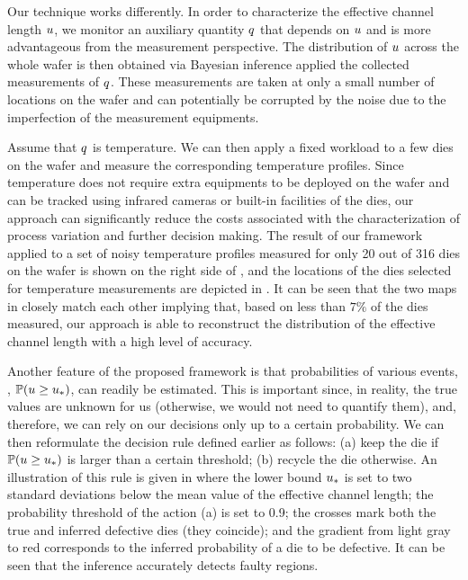 Our technique works differently.
In order to characterize the effective channel length $u$, we monitor an auxiliary quantity $q$ that depends on $u$ and is more advantageous from the measurement perspective.
The distribution of $u$ across the whole wafer is then obtained via Bayesian inference \cite{gelman2004} applied the collected measurements of $q$.
These measurements are taken at only a small number of locations on the wafer and can potentially be corrupted by the noise due to the imperfection of the measurement equipments.

Assume that $q$ is temperature.
We can then apply a fixed workload to a few dies on the wafer and measure the corresponding temperature profiles.
Since temperature does not require extra equipments to be deployed on the wafer and can be tracked using infrared cameras \cite{mesa-martinez2007} or built-in facilities of the dies, our approach can significantly reduce the costs associated with the characterization of process variation and further decision making.
The result of our framework applied to a set of noisy temperature profiles measured for only 20 out of 316 dies on the wafer is shown on the right side of , and the locations of the dies selected for temperature measurements are depicted in .
It can be seen that the two maps in  closely match each other implying that, based on less than $7\%$ of the dies measured, our approach is able to reconstruct the distribution of the effective channel length with a high level of accuracy.

Another feature of the proposed framework is that probabilities of various events, \eg, $\mathbb{P}(u \geq u_*)$, can readily be estimated.
This is important since, in reality, the true values are unknown for us (otherwise, we would not need to quantify them), and, therefore, we can rely on our decisions only up to a certain probability.
We can then reformulate the decision rule defined earlier as follows: (a) keep the die if $\mathbb{P}(u \geq u_*)$ is larger than a certain threshold; (b) recycle the die otherwise.
An illustration of this rule is given in  where the lower bound $u_*$ is set to two standard deviations below the mean value of the effective channel length; the probability threshold of the action (a) is set to 0.9; the crosses mark both the true and inferred defective dies (they coincide); and the gradient from light gray to red corresponds to the inferred probability of a die to be defective. It can be seen that the inference accurately detects faulty regions.


